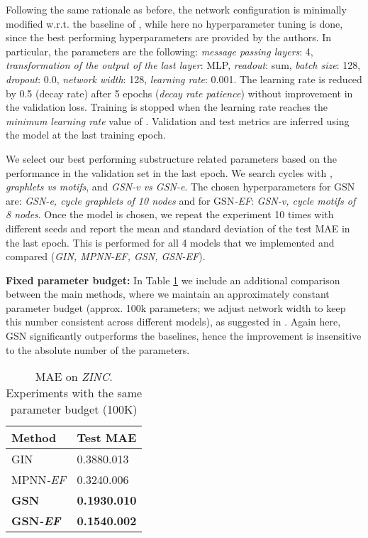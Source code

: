 \documentclass{article} \usepackage{iclr2021_conference,times}
\begin{document}
Following the same rationale as before, the network configuration is minimally modified w.r.t. the baseline of \cite{dwivedi2020benchmarking}, while here no hyperparameter tuning is done, since the best performing hyperparameters are provided by the authors. In particular, the parameters are the following: \textit{message passing layers}: 4, \textit{transformation of the output of the last layer}: MLP, \textit{readout}: sum, \textit{batch size}: 128, \textit{dropout}: 0.0, \textit{network width}: 128, \textit{learning rate}: 0.001. The learning rate is reduced by 0.5 (decay rate) after 5 epochs (\textit{decay rate
patience}) without improvement in the validation loss. Training is stopped when the learning rate reaches the \textit{minimum learning rate} value of .  Validation and test metrics are inferred using the model at the last training epoch. 

We select our best performing substructure related parameters based on the performance in the validation set in the last epoch. We search cycles with  , \textit{graphlets vs motifs}, and \textit{GSN-v vs GSN-e}. The chosen hyperparameters for GSN are:  \textit{GSN-e, cycle graphlets of 10 nodes} and for GSN\textit{-EF}: \textit{GSN-v, cycle motifs of 8 nodes}. Once the model is chosen, we repeat the experiment 10 times with different seeds and report the mean and standard deviation of the test MAE in the last epoch. This is performed for all 4 models that we implemented and compared (\textit{GIN, MPNN\textit{-EF}, GSN, GSN\textit{-EF}}).

        
\noindent\textbf{Fixed parameter budget:}  In Table \ref{tab:zinc_100k} we include an additional comparison between the main methods, where we maintain an approximately constant parameter budget (approx. 100k parameters; we adjust network width to keep this number consistent across different models), as suggested in \cite{dwivedi2020benchmarking}. Again here, GSN significantly outperforms the baselines, hence the improvement is insensitive to the absolute number of the parameters.


\begin{table}[H]
        \centering
\caption{MAE on \textit{ZINC}. Experiments with the same parameter budget (100K)}
          \begin{tabular}{l | l}
Method & Test MAE \\
            \hline
            
            GIN & 0.3880.013\\
            
            MPNN\textit{-EF} & 0.3240.006\\
            \hline
            
            \textbf{GSN} &\textbf{0.1930.010}\\
            
            \textbf{GSN\textit{-EF}} & \textbf{0.1540.002}\\
\end{tabular}\label{tab:zinc_100k}
\end{table}
\end{document}
